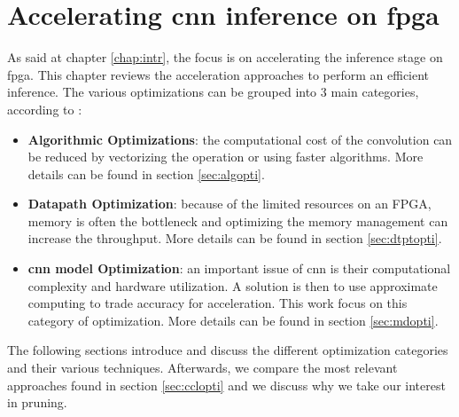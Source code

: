 \chapter{Accelerating \acrshort{cnn} inference on \acrshort{fpga}}
\label{chap:inf}
As said at chapter \ref{chap:intr}, the focus is on accelerating the inference stage on \acrshort{fpga}. This chapter reviews the acceleration approaches to perform an efficient inference. \newline \newline
The various optimizations can be grouped into 3 main categories, according to \textcite{abdelouahab_accelerating_2018}:
\begin{itemize}
    \item \textbf{Algorithmic Optimizations}: the computational cost of the convolution can be reduced by vectorizing the operation or using faster algorithms. More details can be found in section \ref{sec:algopti}.
    \item \textbf{Datapath Optimization}: because of the limited resources on an FPGA, memory is often the bottleneck and optimizing the memory management can increase the throughput. More details can be found in section \ref{sec:dtptopti}.
    \item \textbf{\acrshort{cnn} model Optimization}: an important issue of \acrshort{cnn} is their computational complexity and hardware utilization. A solution is then to use approximate computing to trade accuracy for acceleration. This work focus on this category of optimization. More details can be found in section \ref{sec:mdopti}.
\end{itemize}
The following sections introduce and discuss the different optimization categories and their various techniques. Afterwards, we compare the most relevant approaches found in section \ref{sec:cclopti} and we discuss why we take our interest in pruning.




